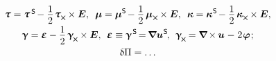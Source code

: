 \begin{otherlanguage}{russian}
\nopagebreak\begin{equation}
\begin{array}{c}
\forcestresstensor = \forcestresstensor^{\hspace{.32ex}\mathsf{S}} \hspace{-0.25ex} - \displaystyle \onehalf \hspace{.2ex} \forcestresstensor_{\hspace{-0.1ex}\Xcompanion} \hspace{-0.1ex} \times \bm{E} , \;\:
%
\couplestresstensor = \couplestresstensor^{\mathsf{S}} \hspace{-0.25ex} - \displaystyle \onehalf \hspace{.32ex} \couplestresstensor_{\Xcompanion} \hspace{-0.1ex} \times \bm{E} , \;\:
%
\wrynesstensor = \wrynesstensor^{\hspace{.12ex}\mathsf{S}} \hspace{-0.25ex} - \displaystyle \onehalf \hspace{.32ex} \wrynesstensor_{\Xcompanion} \hspace{-0.1ex} \times \bm{E} ,
\\[.6em]
%
\distortiontensor = \mathboldepsilon - \displaystyle \onehalf \hspace{.32ex} \distortiontensor_{\hspace{-0.25ex}\Xcompanion} \hspace{-0.1ex} \times \bm{E} , \:\:
%
\mathboldepsilon \equiv \distortiontensor^{\hspace{.2ex}\mathsf{S}} \hspace{-0.32ex} = \hspace{-0.2ex} \boldnabla {\fieldofdisplacements}^{\hspace{0.1ex}\mathsf{S}} \hspace{-0.25ex} , \:\:
%
\distortiontensor_{\hspace{-0.25ex}\Xcompanion} \hspace{-0.16ex}
= \boldnabla \hspace{-0.16ex} \times \hspace{-0.1ex} \fieldofdisplacements \hspace{.12ex} - \hspace{.12ex} 2 \hspace{.16ex} \fieldofrotations \hspace{.16ex} ;
\\[.6em]
%
\variation{\Pi} = \ldots
\end{array}
\end{equation}


\end{otherlanguage}
